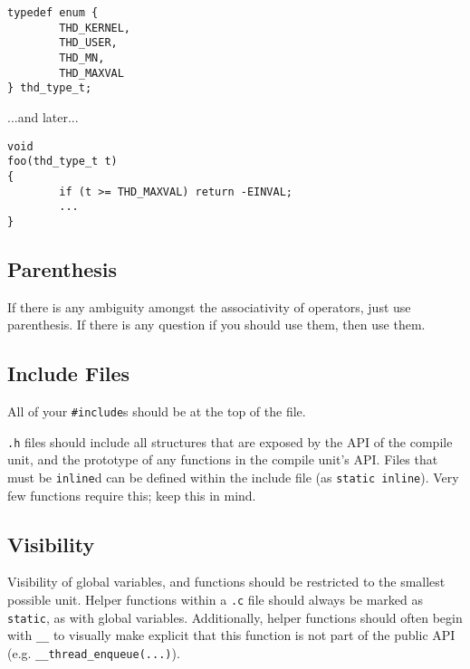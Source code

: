 \documentclass[11pt,onecolumn]{article}
\begin{document}
    \begin{minipage}{3in}
      \footnotesize
      \lstset{language=C}
      \begin{lstlisting}
typedef enum {
        THD_KERNEL,
        THD_USER,
        THD_MN,
        THD_MAXVAL
} thd_type_t;
      \end{lstlisting}
    \end{minipage}

...and later...

    \begin{minipage}{3in}
      \footnotesize
      \lstset{language=C}
      \begin{lstlisting}
void
foo(thd_type_t t)
{
        if (t >= THD_MAXVAL) return -EINVAL;
        ...
}
     \end{lstlisting}
    \end{minipage}


\subsection{Parenthesis}

If there is any ambiguity amongst the associativity of operators, just
use parenthesis.  If there is any question if you should use them,
then use them.

\subsection{Include Files}

All of your {\tt \#include}s should be at the top of the file.

{\tt .h} files should include all structures that are exposed by the
API of the compile unit, and the prototype of any functions in the
compile unit's API.  Files that must be {\tt inline}d can be defined
within the include file (as {\tt static inline}).  Very few functions
require this; keep this in mind.

\subsection{Visibility}

Visibility of global variables, and functions should be restricted to
the smallest possible unit.  Helper functions within a {\tt .c} file
should always be marked as {\tt static}, as with global variables.
Additionally, helper functions should often begin with {\tt \_\_} to
visually make explicit that this function is not part of the public
API (e.g. {\tt \_\_thread\_enqueue(...)}).
\end{document}
